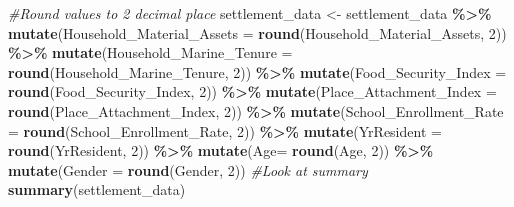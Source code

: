 \documentclass[
]{article}
\newenvironment{Shaded}{\begin{snugshade}}{\end{snugshade}}
\newcommand{\AttributeTok}[1]{\textcolor[rgb]{0.13,0.29,0.53}{#1}}
\newcommand{\CommentTok}[1]{\textcolor[rgb]{0.56,0.35,0.01}{\textit{#1}}}
\newcommand{\DecValTok}[1]{\textcolor[rgb]{0.00,0.00,0.81}{#1}}
\newcommand{\FunctionTok}[1]{\textcolor[rgb]{0.13,0.29,0.53}{\textbf{#1}}}
\newcommand{\NormalTok}[1]{#1}
\newcommand{\OtherTok}[1]{\textcolor[rgb]{0.56,0.35,0.01}{#1}}
\newcommand{\SpecialCharTok}[1]{\textcolor[rgb]{0.81,0.36,0.00}{\textbf{#1}}}
\newcommand{\StringTok}[1]{\textcolor[rgb]{0.31,0.60,0.02}{#1}}
\begin{document}
\begin{Shaded}
\begin{Highlighting}[]
\CommentTok{\#Round values to 2 decimal place}
\NormalTok{settlement\_data }\OtherTok{\textless{}{-}}\NormalTok{ settlement\_data }\SpecialCharTok{\%\textgreater{}\%} 
                  \FunctionTok{mutate}\NormalTok{(}\StringTok{\textasciigrave{}}\AttributeTok{Household\_Material\_Assets}\StringTok{\textasciigrave{}} \OtherTok{=} \FunctionTok{round}\NormalTok{(}\StringTok{\textasciigrave{}}\AttributeTok{Household\_Material\_Assets}\StringTok{\textasciigrave{}}\NormalTok{, }\DecValTok{2}\NormalTok{)) }\SpecialCharTok{\%\textgreater{}\%}
                  \FunctionTok{mutate}\NormalTok{(}\StringTok{\textasciigrave{}}\AttributeTok{Household\_Marine\_Tenure}\StringTok{\textasciigrave{}} \OtherTok{=} \FunctionTok{round}\NormalTok{(}\StringTok{\textasciigrave{}}\AttributeTok{Household\_Marine\_Tenure}\StringTok{\textasciigrave{}}\NormalTok{, }\DecValTok{2}\NormalTok{)) }\SpecialCharTok{\%\textgreater{}\%}
                  \FunctionTok{mutate}\NormalTok{(}\StringTok{\textasciigrave{}}\AttributeTok{Food\_Security\_Index}\StringTok{\textasciigrave{}} \OtherTok{=} \FunctionTok{round}\NormalTok{(}\StringTok{\textasciigrave{}}\AttributeTok{Food\_Security\_Index}\StringTok{\textasciigrave{}}\NormalTok{, }\DecValTok{2}\NormalTok{)) }\SpecialCharTok{\%\textgreater{}\%}
                  \FunctionTok{mutate}\NormalTok{(}\StringTok{\textasciigrave{}}\AttributeTok{Place\_Attachment\_Index}\StringTok{\textasciigrave{}} \OtherTok{=} \FunctionTok{round}\NormalTok{(}\StringTok{\textasciigrave{}}\AttributeTok{Place\_Attachment\_Index}\StringTok{\textasciigrave{}}\NormalTok{, }\DecValTok{2}\NormalTok{)) }\SpecialCharTok{\%\textgreater{}\%}
                  \FunctionTok{mutate}\NormalTok{(}\StringTok{\textasciigrave{}}\AttributeTok{School\_Enrollment\_Rate}\StringTok{\textasciigrave{}} \OtherTok{=} \FunctionTok{round}\NormalTok{(}\StringTok{\textasciigrave{}}\AttributeTok{School\_Enrollment\_Rate}\StringTok{\textasciigrave{}}\NormalTok{, }\DecValTok{2}\NormalTok{)) }\SpecialCharTok{\%\textgreater{}\%}
                  \FunctionTok{mutate}\NormalTok{(}\StringTok{\textasciigrave{}}\AttributeTok{YrResident}\StringTok{\textasciigrave{}} \OtherTok{=} \FunctionTok{round}\NormalTok{(}\StringTok{\textasciigrave{}}\AttributeTok{YrResident}\StringTok{\textasciigrave{}}\NormalTok{, }\DecValTok{2}\NormalTok{)) }\SpecialCharTok{\%\textgreater{}\%}
                  \FunctionTok{mutate}\NormalTok{(}\StringTok{\textasciigrave{}}\AttributeTok{Age}\StringTok{\textasciigrave{}}\OtherTok{=} \FunctionTok{round}\NormalTok{(}\StringTok{\textasciigrave{}}\AttributeTok{Age}\StringTok{\textasciigrave{}}\NormalTok{, }\DecValTok{2}\NormalTok{)) }\SpecialCharTok{\%\textgreater{}\%}
                  \FunctionTok{mutate}\NormalTok{(}\StringTok{\textasciigrave{}}\AttributeTok{Gender}\StringTok{\textasciigrave{}} \OtherTok{=} \FunctionTok{round}\NormalTok{(}\StringTok{\textasciigrave{}}\AttributeTok{Gender}\StringTok{\textasciigrave{}}\NormalTok{, }\DecValTok{2}\NormalTok{))}
\CommentTok{\#Look at summary}
\FunctionTok{summary}\NormalTok{(settlement\_data)}
\end{Highlighting}
\end{Shaded}
\end{document}
